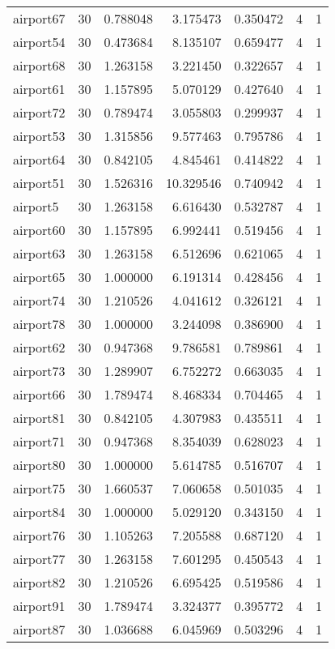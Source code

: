 \begin{longtable}{|l|r|r|r|r|r|r|}
airport67 & 30 & 0.788048 & 3.175473 & 0.350472 & 4 & 1 \\
airport54 & 30 & 0.473684 & 8.135107 & 0.659477 & 4 & 1 \\
airport68 & 30 & 1.263158 & 3.221450 & 0.322657 & 4 & 1 \\
airport61 & 30 & 1.157895 & 5.070129 & 0.427640 & 4 & 1 \\
airport72 & 30 & 0.789474 & 3.055803 & 0.299937 & 4 & 1 \\
airport53 & 30 & 1.315856 & 9.577463 & 0.795786 & 4 & 1 \\
airport64 & 30 & 0.842105 & 4.845461 & 0.414822 & 4 & 1 \\
airport51 & 30 & 1.526316 & 10.329546 & 0.740942 & 4 & 1 \\
airport5 & 30 & 1.263158 & 6.616430 & 0.532787 & 4 & 1 \\
airport60 & 30 & 1.157895 & 6.992441 & 0.519456 & 4 & 1 \\
airport63 & 30 & 1.263158 & 6.512696 & 0.621065 & 4 & 1 \\
airport65 & 30 & 1.000000 & 6.191314 & 0.428456 & 4 & 1 \\
airport74 & 30 & 1.210526 & 4.041612 & 0.326121 & 4 & 1 \\
airport78 & 30 & 1.000000 & 3.244098 & 0.386900 & 4 & 1 \\
airport62 & 30 & 0.947368 & 9.786581 & 0.789861 & 4 & 1 \\
airport73 & 30 & 1.289907 & 6.752272 & 0.663035 & 4 & 1 \\
airport66 & 30 & 1.789474 & 8.468334 & 0.704465 & 4 & 1 \\
airport81 & 30 & 0.842105 & 4.307983 & 0.435511 & 4 & 1 \\
airport71 & 30 & 0.947368 & 8.354039 & 0.628023 & 4 & 1 \\
airport80 & 30 & 1.000000 & 5.614785 & 0.516707 & 4 & 1 \\
airport75 & 30 & 1.660537 & 7.060658 & 0.501035 & 4 & 1 \\
airport84 & 30 & 1.000000 & 5.029120 & 0.343150 & 4 & 1 \\
airport76 & 30 & 1.105263 & 7.205588 & 0.687120 & 4 & 1 \\
airport77 & 30 & 1.263158 & 7.601295 & 0.450543 & 4 & 1 \\
airport82 & 30 & 1.210526 & 6.695425 & 0.519586 & 4 & 1 \\
airport91 & 30 & 1.789474 & 3.324377 & 0.395772 & 4 & 1 \\
airport87 & 30 & 1.036688 & 6.045969 & 0.503296 & 4 & 1 \\

\end{longtable}
